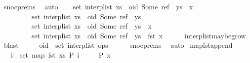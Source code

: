 \begin{isabellebody}
\ snoc{\isachardot}prems\ \isamarkupfalse%
\ auto\isanewline
\ \ \isamarkupfalse%
\ {\isachardoublequoteopen}set\ {\isacharparenleft}interp{\isacharunderscore}list\ {\isacharparenleft}{\isacharparenleft}xs\ {\isacharat}\ {\isacharparenleft}oid{\isacharcomma}\ Some\ ref{\isacharparenright}\ {\isacharhash}\ ys{\isacharparenright}\ {\isacharat}\ {\isacharbrackleft}x{\isacharbrackright}{\isacharparenright}{\isacharparenright}\ {\isacharequal}\isanewline
\ \ \ \ \ \ \ \ \ set\ {\isacharparenleft}interp{\isacharunderscore}list\ {\isacharparenleft}xs\ {\isacharat}\ {\isacharparenleft}oid{\isacharcomma}\ Some\ ref{\isacharparenright}\ {\isacharhash}\ ys{\isacharparenright}{\isacharparenright}\ {\isasymor}\ \isanewline
\ \ \ \ \ \ \ \ \ set\ {\isacharparenleft}interp{\isacharunderscore}list\ {\isacharparenleft}{\isacharparenleft}xs\ {\isacharat}\ {\isacharparenleft}oid{\isacharcomma}\ Some\ ref{\isacharparenright}\ {\isacharhash}\ ys{\isacharparenright}\ {\isacharat}\ {\isacharbrackleft}x{\isacharbrackright}{\isacharparenright}{\isacharparenright}\ {\isacharequal}\isanewline
\ \ \ \ \ \ \ \ \ set\ {\isacharparenleft}interp{\isacharunderscore}list\ {\isacharparenleft}xs\ {\isacharat}\ {\isacharparenleft}oid{\isacharcomma}\ Some\ ref{\isacharparenright}\ {\isacharhash}\ ys{\isacharparenright}{\isacharparenright}\ {\isasymunion}\ {\isacharbraceleft}fst\ x{\isacharbraceright}{\isachardoublequoteclose}\isanewline
\ \ \ \ \isamarkupfalse%
\ interp{\isacharunderscore}list{\isacharunderscore}maybe{\isacharunderscore}grow{}\ \isamarkupfalse%
\ blast\isanewline
\ \ \isamarkupfalse%
\ \isamarkupfalse%
\ {\isachardoublequoteopen}oid\ {\isasymnotin}\ set\ {\isacharparenleft}interp{\isacharunderscore}list\ ops{\isacharparenright}{\isachardoublequoteclose}\isanewline
\ \ \ \ \isamarkupfalse%
\ snoc{\isachardot}prems{\isacharparenleft}{}{\isacharparenright}\ \isamarkupfalse%
\ auto\isanewline
{}\isamarkupfalse%
%
\endisatagproof
{\isafoldproof}%
%
\isadelimproof
\isanewline
%
\endisadelimproof
\isanewline
{}\isamarkupfalse%
\ map{\isacharunderscore}fst{\isacharunderscore}append{}{\isacharcolon}\isanewline
\ \ \ {\isachardoublequoteopen}{\isasymforall}i\ {\isasymin}\ set\ {\isacharparenleft}map\ fst\ xs{\isacharparenright}{\isachardot}\ P\ i{\isachardoublequoteclose}\isanewline
\ \ \ \ \ {\isachardoublequoteopen}P\ x{\isachardoublequoteclose}\isanewline

\end{isabellebody}
